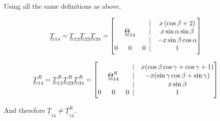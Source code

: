\documentclass[onecolumn,10pt]{jhwhw}
\def\du#1{\underline{\underline{#1}}}
\begin{document}
Using all the same definitions as above,

\begin{align*}
\du{T}_{14} = \du{T}_{12} \du{T}_{23} \du{T}_{34} = 
\begin{bmatrix*}[c]
& & \hspace{1em} | & x \left ( \cos \beta + 2 \right ) \\
& \du{\Theta}_{14} & \hspace{1em} | & x \sin \alpha \sin \beta \\
& & \hspace{1em} | & -x \sin \beta \cos \alpha \\
0 & 0 & 0 \hspace{.5em} | & 1 \\
\end{bmatrix*}
\end{align*}

\begin{align*}
\du{T}_{14}^{R} = \du{T}_{12}^{R} \du{T}_{23}^{R} \du{T}_{34}^{R} = 
\begin{bmatrix*}[c]
& & \hspace{1em} | & x (\cos \beta \cos \gamma + \cos \gamma + 1) \\
& \du{\Theta}_{14}^{R} & \hspace{1em} | & -x (\sin \gamma \cos \beta + \sin \gamma) \\
& & \hspace{1em} | & x \sin \beta \\
0 & 0 & 0 \hspace{.5em} | & 1 \\
\end{bmatrix*}
\end{align*}

And therefore $\du{T}_{14} \neq \du{T}_{14}^{R}$.
\end{document}

